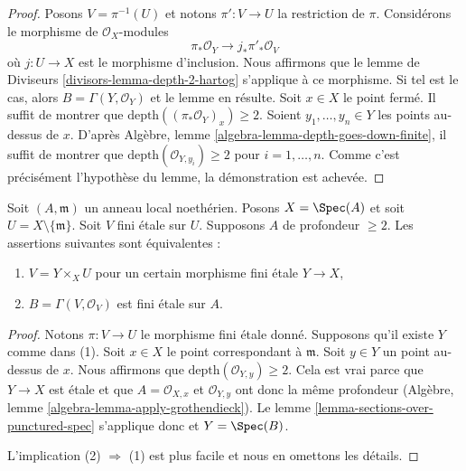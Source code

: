 \begin{proof}
Posons $V = \pi^{-1}(U)$ et notons $\pi' : V \to U$ la restriction de $\pi$.
Considérons le morphisme de $\mathcal{O}_X$-modules
$$
\pi_*\mathcal{O}_Y \longrightarrow j_*\pi'_*\mathcal{O}_V
$$
où $j : U \to X$ est le morphisme d'inclusion. Nous affirmons que le
lemme de Diviseurs \ref{divisors-lemma-depth-2-hartog}
s'applique à ce morphisme. Si tel est le cas, alors $B = \Gamma(Y, \mathcal{O}_Y)$
et le lemme en résulte. Soit $x \in X$ le point fermé.
Il suffit de montrer que
$\text{depth}((\pi_*\mathcal{O}_Y)_x) \geq 2$.
Soient $y_1, \ldots, y_n \in Y$ les points au-dessus de $x$.
D'après Algèbre, lemme \ref{algebra-lemma-depth-goes-down-finite},
il suffit de montrer que
$\text{depth}(\mathcal{O}_{Y, y_i}) \geq 2$ pour $i = 1, \ldots, n$.
Comme c'est précisément l'hypothèse du lemme, la démonstration est achevée.
\end{proof}

\begin{lemma}
\label{lemma-reformulate-purity}
Soit $(A, \mathfrak m)$ un anneau local noethérien. Posons $X = \Spec(A)$
et soit $U = X \setminus \{\mathfrak m\}$.
Soit $V$ fini étale
sur $U$. Supposons $A$ de profondeur $\geq 2$. Les assertions suivantes sont équivalentes :
\begin{enumerate}
\item $V = Y \times_X U$ pour un certain morphisme fini étale $Y \to X$,
\item $B = \Gamma(V, \mathcal{O}_V)$ est fini étale sur $A$.
\end{enumerate}
\end{lemma}

\begin{proof}
Notons $\pi : V \to U$ le morphisme fini étale donné.
Supposons qu'il existe $Y$ comme dans (1). Soit $x \in X$ le point
correspondant à $\mathfrak m$.
Soit $y \in Y$ un point au-dessus de $x$. Nous affirmons que
$\text{depth}(\mathcal{O}_{Y, y}) \geq 2$.
Cela est vrai parce que $Y \to X$ est étale et que
$A = \mathcal{O}_{X, x}$ et $\mathcal{O}_{Y, y}$ ont donc
la même profondeur (Algèbre, lemme \ref{algebra-lemma-apply-grothendieck}).
Le lemme \ref{lemma-sections-over-punctured-spec}
s'applique donc et $Y = \Spec(B)$.

\medskip\noindent
L'implication (2) $\Rightarrow$ (1) est plus facile et nous en
omettons les détails.
\end{proof}

